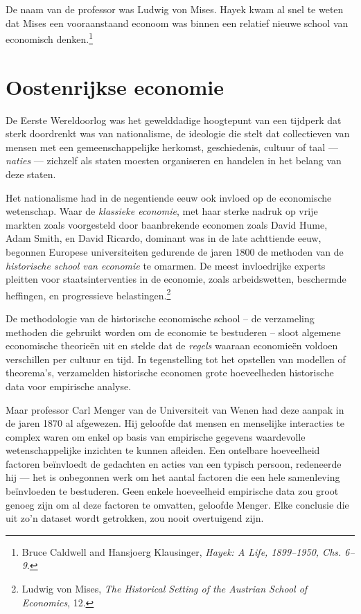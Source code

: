 \documentclass[
  a5paper,
  smalldemyvopaper,11pt,twoside,onecolumn,openright,extrafontsizes,
hidelinks]{memoir}
\begin{document}
De naam van de professor was Ludwig von Mises. Hayek kwam al snel te
weten dat Mises een vooraanstaand econoom was binnen een relatief nieuwe
school van economisch denken.\footnote{\hspace{0pt}Bruce Caldwell and
  Hansjoerg Klausinger, \emph{Hayek: A Life, 1899--1950, Chs. 6--9}.}

\section{Oostenrijkse economie}\label{oostenrijkse-economie}

De Eerste Wereldoorlog was het gewelddadige hoogtepunt van een tijdperk
dat sterk doordrenkt was van nationalisme, de ideologie die stelt dat
collectieven van mensen met een gemeenschappelijke herkomst,
geschiedenis, cultuur of taal --- \emph{naties} --- zichzelf als staten
moesten organiseren en handelen in het belang van deze staten.

Het nationalisme had in de negentiende eeuw ook invloed op de
economische wetenschap. Waar de \emph{klassieke economie}, met haar
sterke nadruk op vrije markten zoals voorgesteld door baanbrekende
economen zoals David Hume, Adam Smith, en David Ricardo, dominant was in
de late achttiende eeuw, begonnen Europese universiteiten gedurende de
jaren 1800 de methoden van de \emph{historische school van economie} te
omarmen. De meest invloedrijke experts pleitten voor staatsinterventies
in de economie, zoals arbeidswetten, beschermde heffingen, en
progressieve belastingen.\footnote{\hspace{0pt}Ludwig von Mises,
  \emph{The Historical Setting of the Austrian School of Economics}, 12.}

De methodologie van de historische economische school -- de verzameling
methoden die gebruikt worden om de economie te bestuderen -- sloot
algemene economische theorieën uit en stelde dat de \emph{regels}
waaraan economieën voldoen verschillen per cultuur en tijd. In
tegenstelling tot het opstellen van modellen of theorema's, verzamelden
historische economen grote hoeveelheden historische data voor empirische
analyse.

Maar professor Carl Menger van de Universiteit van Wenen had deze aanpak
in de jaren 1870 al afgewezen. Hij geloofde dat mensen en menselijke
interacties te complex waren om enkel op basis van empirische gegevens
waardevolle wetenschappelijke inzichten te kunnen afleiden. Een
ontelbare hoeveelheid factoren beïnvloedt de gedachten en acties van een
typisch persoon, redeneerde hij --- het is onbegonnen werk om het aantal
factoren die een hele samenleving beïnvloeden te bestuderen. Geen enkele
hoeveelheid empirische data zou groot genoeg zijn om al deze factoren te
omvatten, geloofde Menger. Elke conclusie die uit zo'n dataset wordt
getrokken, zou nooit overtuigend zijn.
\end{document}
